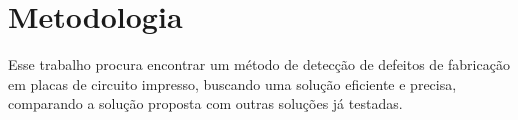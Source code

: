 \chapter{Metodologia}

Esse trabalho procura encontrar um método de detecção de defeitos de fabricação em placas de circuito impresso, buscando uma solução eficiente e precisa, comparando a solução proposta com outras soluções já testadas. 


